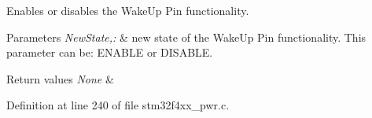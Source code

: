Enables or disables the Wake\-Up Pin functionality. 


\begin{DoxyParams}{Parameters}
{\em New\-State,\-:} & new state of the Wake\-Up Pin functionality. This parameter can be\-: E\-N\-A\-B\-L\-E or D\-I\-S\-A\-B\-L\-E. \\
\hline
\end{DoxyParams}

\begin{DoxyRetVals}{Return values}
{\em None} & \\
\hline
\end{DoxyRetVals}


Definition at line 240 of file stm32f4xx\-\_\-pwr.\-c.

